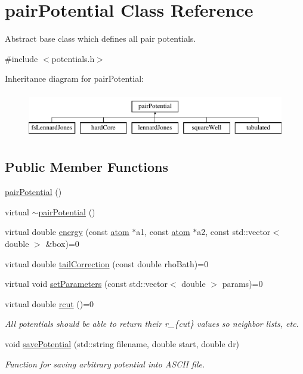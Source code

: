 \hypertarget{classpair_potential}{\section{pair\-Potential Class Reference}
\label{classpair_potential}
}


Abstract base class which defines all pair potentials.  




{\ttfamily \#include $<$potentials.\-h$>$}

Inheritance diagram for pair\-Potential\-:\begin{figure}[H]
\begin{center}
\leavevmode
\includegraphics[height=2.000000cm]{classpair_potential}
\end{center}
\end{figure}
\subsection*{Public Member Functions}
\begin{DoxyCompactItemize}
\item 
\hyperlink{classpair_potential_a97a5ee64f179cbc0636dc2364fe7f7f4}{pair\-Potential} ()
\item 
virtual \hyperlink{classpair_potential_a8b68006b0fa57cb78c31e6dd2a8dde86}{$\sim$pair\-Potential} ()
\item 
virtual double \hyperlink{classpair_potential_a2b1e50ef9b6e50b01d89d31d5460ad76}{energy} (const \hyperlink{classatom}{atom} $\ast$a1, const \hyperlink{classatom}{atom} $\ast$a2, const std\-::vector$<$ double $>$ \&box)=0
\item 
virtual double \hyperlink{classpair_potential_a5387d21d8d487d1d42e9eaf7cae9175b}{tail\-Correction} (const double rho\-Bath)=0
\item 
virtual void \hyperlink{classpair_potential_ad4b237646f9de2ae9f95cc9350564bc5}{set\-Parameters} (const std\-::vector$<$ double $>$ params)=0
\item 
virtual double \hyperlink{classpair_potential_abf4f8d231c5e2e36d72916d33dcd75f0}{rcut} ()=0
\begin{DoxyCompactList}\small\item\em All potentials should be able to return their r\-\_\-\{cut\} values so neighbor lists, etc. \end{DoxyCompactList}\item 
void \hyperlink{classpair_potential_a2d57e0c3678ef3624cc1edc2a4f5d121}{save\-Potential} (std\-::string filename, double start, double dr)
\begin{DoxyCompactList}\small\item\em Function for saving arbitrary potential into A\-S\-C\-I\-I file. \end{DoxyCompactList}\end{DoxyCompactItemize}
